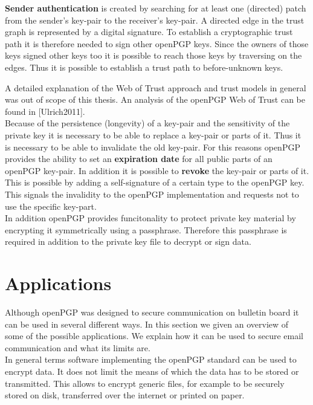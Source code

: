 \textbf{Sender authentication} is created by searching for at least one (directed) patch from the sender's key-pair to the receiver's key-pair. A directed edge in the trust graph is represented by a digital signature. To establish a cryptographic trust path it is therefore needed to sign other openPGP keys. Since the owners of those keys signed other keys too it is possible to reach those keys by traversing on the edges. Thus it is possible to establish a trust path to before-unknown keys.

A detailed explanation of the Web of Trust approach and trust models in general was out of scope of this thesis. An analysis of the openPGP Web of Trust can be found in [Ulrich2011]. \\


Because of the persistence (longevity) of a key-pair and the sensitivity of the private key it is necessary to be able to replace a key-pair or parts of it. Thus it is necessary to be able to invalidate the old key-pair. For this reasons openPGP provides the ability to set an \textbf{expiration date} for all public parts of an openPGP key-pair. In addition it is possible to \textbf{revoke} the key-pair or parts of it. This is possible by adding a self-signature of a certain type to the openPGP key. This signals the invalidity to the openPGP implementation and requests not to use the specific key-part. \\

In addition openPGP provides funcitonality to protect private key material by encrypting it symmetrically using a passphrase. Therefore this passphrase is required in addition to the private key file to decrypt or sign data.

\section{Applications} \label{section:openpgp:smime}

Although openPGP was designed to secure communication on bulletin board it can be used in several different ways. In this section we given an overview of some of the possible applications. We explain how it can be used to secure email communication and what its limits are.  \\


In general terms software implementing the openPGP standard can be used to encrypt data. It does not limit the means of which the data has to be stored or transmitted. This allows to encrypt generic files, for example to be securely stored on disk, transferred over the internet or printed on paper. \\  


